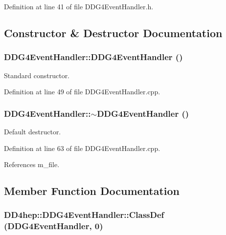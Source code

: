 Definition at line 41 of file DDG4EventHandler.h.

\subsection{Constructor \& Destructor Documentation}
\hypertarget{class_d_d4hep_1_1_d_d_g4_event_handler_af3bf78e2d9ae9789b6e9a0ff8c332a07}{
\subsubsection[{DDG4EventHandler}]{\setlength{\rightskip}{0pt plus 5cm}DDG4EventHandler::DDG4EventHandler ()}}
\label{class_d_d4hep_1_1_d_d_g4_event_handler_af3bf78e2d9ae9789b6e9a0ff8c332a07}


Standard constructor. 

Definition at line 49 of file DDG4EventHandler.cpp.\hypertarget{class_d_d4hep_1_1_d_d_g4_event_handler_a149942eb56e028c4f5ea9f814e6dbd3b}{
\subsubsection[{$\sim$DDG4EventHandler}]{\setlength{\rightskip}{0pt plus 5cm}DDG4EventHandler::$\sim$DDG4EventHandler ()}}
\label{class_d_d4hep_1_1_d_d_g4_event_handler_a149942eb56e028c4f5ea9f814e6dbd3b}


Default destructor. 

Definition at line 63 of file DDG4EventHandler.cpp.

References m\_\-file.

\subsection{Member Function Documentation}
\hypertarget{class_d_d4hep_1_1_d_d_g4_event_handler_a0b89e00baf1f1e9a95f4f31517635e34}{
\subsubsection[{ClassDef}]{\setlength{\rightskip}{0pt plus 5cm}DD4hep::DDG4EventHandler::ClassDef ({\bf DDG4EventHandler}, \/  0)}}
\label{class_d_d4hep_1_1_d_d_g4_event_handler_a0b89e00baf1f1e9a95f4f31517635e34}


